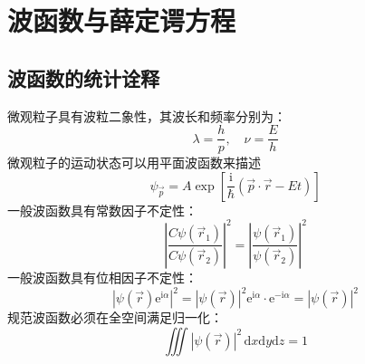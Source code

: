 \section{波函数与薛定谔方程}

\subsection{波函数的统计诠释}
微观粒子具有波粒二象性，其波长和频率分别为：
$$
    \lambda=\frac{h}{p}, \quad \nu=\frac{E}{h}
$$
微观粒子的运动状态可以用平面波函数来描述
$$
    \psi_{\vec{p}}=A\exp\left[\frac{\mathrm{i}}{\hbar}\left(\vec{p}\cdot\vec{r}-Et\right)\right]
$$
一般波函数具有常数因子不定性：
$$
    \left|\frac{C\psi(\vec{r}_1)}{C\psi(\vec{r}_2)}\right|^2 = \left|\frac{\psi(\vec{r}_1)}{\psi(\vec{r}_2)}\right|^2
$$
一般波函数具有位相因子不定性：
$$
    \left|\psi(\vec{r})\mathrm{e}^{\mathrm{i}\alpha}\right|^2
    = |\psi(\vec{r})|^2\mathrm{e}^{\mathrm{i}\alpha}\cdot\mathrm{e}^{-\mathrm{i}\alpha}
    = \left|\psi(\vec{r})\right|^2
$$
规范波函数必须在全空间满足归一化：
$$
    \iiint\left|\psi(\vec{r})\right|^2\,\mathrm{d}x\mathrm{d}y\mathrm{d}z=1
$$











